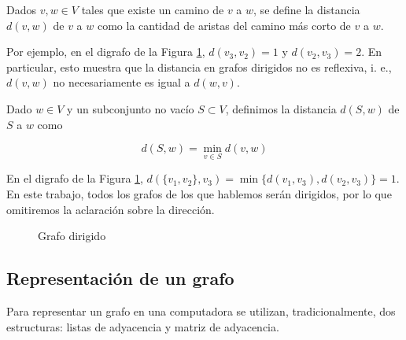 \begin{defi}
Dados $v, w \in V$ tales que existe un camino de $v$ a $w$, se define la distancia $d(v, w)$ de $v$ a $w$ como la cantidad de aristas del camino más corto de $v$ a $w$.
\end{defi}

Por ejemplo, en el digrafo de la Figura \ref{fig:grafo3}, $d(v_3, v_2) = 1$ y $d(v_2, v_3) = 2$. En particular, esto muestra que la distancia en grafos dirigidos no es reflexiva, i. e., $d(v, w)$ no necesariamente es igual a $d(w, v)$.

\begin{defi}
Dado $w \in V$ y un subconjunto no vacío $S \subset V$, definimos la distancia $d(S, w)$ de $S$ a $w$ como

\[d(S, w) = \min\limits_{v \in S}d(v, w)\]
\end{defi}

En el digrafo de la Figura \ref{fig:grafo3}, $d(\{v_1, v_2\}, v_3) = \min\{d(v_1, v_3), d(v_2, v_3)\} = 1$.\\[0.5cm]

En este trabajo, todos los grafos de los que hablemos serán dirigidos, por lo que omitiremos la aclaración sobre la dirección.

\begin{figure}
\begin{center}
\end{center}
\caption{Grafo dirigido}
\label{fig:grafo3}
\end{figure}

\subsection{Representación de un grafo}
Para representar un grafo en una computadora se utilizan, tradicionalmente, dos estructuras: listas de adyacencia y matriz de adyacencia.

